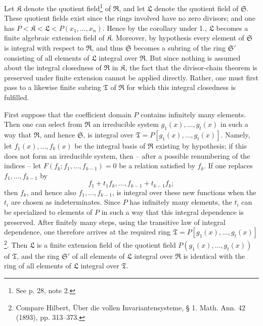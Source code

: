 \documentclass[11pt]{article}
\begin{document}
Let $\mathfrak K$ denote the quotient field\footnote{See p. 28, note 2.} of $\mathfrak R$, and let $\mathfrak L$ denote the quotient field of $\mathfrak S$. These quotient fields exist since the rings involved have no zero divisors; and one has $P<\mathfrak K<\mathfrak L<P(x_1,\ldots,x_n)$. Hence by the corollary under 1., $\mathfrak L$ becomes a finite algebraic extension field of $\mathfrak K$. Moreover, by hypothesis every element of $\mathfrak S$ is integral with respect to $\mathfrak R$, and thus $\mathfrak S$ becomes a subring of the ring $\mathfrak S'$ consisting of all elements of $\mathfrak L$ integral over $\mathfrak R$. But since nothing is assumed about the integral closedness of $\mathfrak R$ in $\mathfrak K$, the fact that the divisor-chain theorem is preserved under finite extension cannot be applied directly. Rather, one must first pass to a likewise finite subring $\mathfrak T$ of $\mathfrak R$ for which this integral closedness is fulfilled.

First suppose that the coefficient domain $P$ contains infinitely many elements. Then one can select from $\mathfrak R$ an irreducible system $g_1(x),\ldots,g_t(x)$ in such a way that $\mathfrak R$, and hence $\mathfrak S$, is integral over $\mathfrak T=P[g_1(x),\ldots,g_t(x)]$. Namely, let $f_1(x),\ldots,f_k(x)$ be the integral basis of $\mathfrak R$ existing by hypothesis; if this does not form an irreducible system, then -- after a possible renumbering of the indices -- let $F(f_k;f_1,
\ldots,f_{k-1})=0$ be a relation satisfied by $f_k$. If one replaces $f_1,
\ldots,f_{k-1}$ by
\[
 f_1+t_1f_k,\ldots,f_{k-1}+t_{k-1}f_k;
\]
then $f_k$, and hence also $f_1,
\ldots,f_{k-1}$, is integral over these new functions when the $t_i$ are chosen as indeterminates. Since $P$ has infinitely many elements, the $t_i$ can be specialized to elements of $P$ in such a way that this integral dependence is preserved. After finitely many steps, using the transitive law of integral dependence, one therefore arrives at the required ring $\mathfrak T=P[g_1(x),\ldots,g_t(x)]$\footnote{Compare Hilbert, Über die vollen Invariantensysteme, § 1. Math. Ann. 42 (1893), pp. 313--373.}. Then $\mathfrak L$ is a finite extension field of the quotient field $P(g_1(x),\ldots,g_t(x))$ of $\mathfrak T$, and the ring $\mathfrak S'$ of all elements of $\mathfrak L$ integral over $\mathfrak R$ is identical with the ring of all elements of $\mathfrak L$ integral over $\mathfrak T$.
\end{document}

